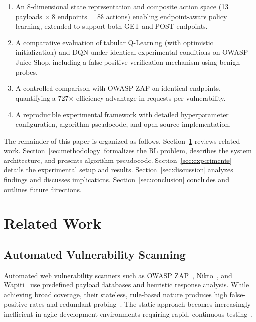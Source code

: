 \documentclass[5p,twocolumn]{elsarticle}
\begin{document}
\begin{enumerate}
    \item An 8-dimensional state representation and composite action space (13 payloads $\times$ 8 endpoints = 88 actions) enabling endpoint-aware policy learning, extended to support both GET and POST endpoints.
    \item A comparative evaluation of tabular Q-Learning (with optimistic initialization) and DQN under identical experimental conditions on OWASP Juice Shop, including a false-positive verification mechanism using benign probes.
    \item A controlled comparison with OWASP ZAP on identical endpoints, quantifying a 727$\times$ efficiency advantage in requests per vulnerability.
    \item A reproducible experimental framework with detailed hyperparameter configuration, algorithm pseudocode, and open-source implementation.
\end{enumerate}

The remainder of this paper is organized as follows. Section~\ref{sec:related} reviews related work. Section~\ref{sec:methodology} formalizes the RL problem, describes the system architecture, and presents algorithm pseudocode. Section~\ref{sec:experiments} details the experimental setup and results. Section~\ref{sec:discussion} analyzes findings and discusses implications. Section~\ref{sec:conclusion} concludes and outlines future directions.

\section{Related Work}
\label{sec:related}

\subsection{Automated Vulnerability Scanning}

Automated web vulnerability scanners such as OWASP ZAP~\cite{zap2024}, Nikto~\cite{nikto}, and Wapiti~\cite{wapiti} use predefined payload databases and heuristic response analysis. While achieving broad coverage, their stateless, rule-based nature produces high false-positive rates and redundant probing~\cite{shah2021}. The static approach becomes increasingly inefficient in agile development environments requiring rapid, continuous testing~\cite{holm2017}.
\end{document}
